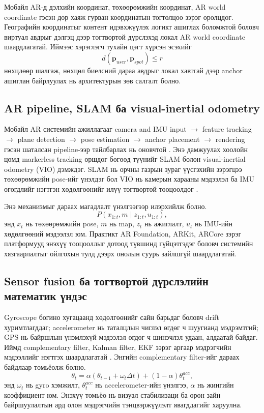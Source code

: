 \begin{sloppy}
Мобайл AR-д дэлхийн координат, төхөөрөмжийн координат, AR world coordinate гэсэн дор хаяж гурван координатын тогтолцоо зэрэг оролцдог. Географийн координатыг контент идэвхжүүлэх логикт ашиглах боломжтой боловч виртуал авдрыг дэлгэц дээр тогтвортой дүрслэхэд локал AR world coordinate шаардлагатай. Иймээс хэрэглэгч тухайн цэгт хүрсэн эсэхийг
\[
d(\mathbf{p}_{user}, \mathbf{p}_{spot}) \le r
\]
нөхцлөөр шалгаж, нөхцөл биелсний дараа авдрыг локал хавтгай дээр anchor ашиглан байрлуулах нь архитектурын зөв салгалт болно.

\subsection{AR pipeline, SLAM ба visual-inertial odometry}

Мобайл AR системийн ажиллагааг camera and IMU input $\rightarrow$ feature tracking $\rightarrow$ plane detection $\rightarrow$ pose estimation $\rightarrow$ anchor placement $\rightarrow$ rendering гэсэн шаталсан pipeline-ээр тайлбарлах нь оновчтой \cite{Arena2022AROverview,Haneefa2024}. Энэ дамжуулах хоолойн цөмд markerless tracking оршдог бөгөөд түүнийг SLAM болон visual-inertial odometry (VIO) дэмждэг. SLAM нь орчны газрын зураг үүсгэхийн зэрэгцээ төхөөрөмжийн pose-ийг үнэлдэг бол VIO нь камерын харааны мэдээлэл ба IMU өгөгдлийг нэгтгэн хөдөлгөөнийг илүү тогтвортой тооцоолдог \cite{Syed2022ARTracking}.

Энэ механизмыг дараах магадлалт үнэлгээгээр илэрхийлж болно.
\[
P(x_{1:t}, m \mid z_{1:t}, u_{1:t}),
\]
энд $x_t$ нь төхөөрөмжийн pose, $m$ нь map, $z_t$ нь ажиглалт, $u_t$ нь IMU-ийн хөдөлгөөний мэдээлэл юм. Практикт AR Foundation, ARKit, ARCore зэрэг платформууд энэхүү тооцооллыг дотоод түвшинд гүйцэтгэдэг боловч системийн хязгаарлалтыг ойлгохын тулд дээрх онолын суурь зайлшгүй шаардлагатай.

\subsection{Sensor fusion ба тогтвортой дүрслэлийн математик үндэс}

Gyroscope богино хугацаанд хөдөлгөөнийг сайн барьдаг боловч drift хуримтлагддаг; accelerometer нь таталцлын чиглэл өгдөг ч шуугианд мэдрэмтгий; GPS нь байршлын үнэмлэхүй мэдээлэл өгдөг ч шинэчлэл удаан, алдаатай байдаг. Иймд complementary filter, Kalman filter, EKF зэрэг аргаар мэдрэгчийн мэдээллийг нэгтгэх шаардлагатай \cite{Syed2022ARTracking,Kaplan2006}. Энгийн complementary filter-ийг дараах байдлаар томьёолж болно.
\[
\theta_t = \alpha(\theta_{t-1} + \omega_t \Delta t) + (1-\alpha)\theta^{acc}_t,
\]
энд $\omega_t$ нь gyro хэмжилт, $\theta^{acc}_t$ нь accelerometer-ийн үнэлгээ, $\alpha$ нь жингийн коэффициент юм. Энэхүү томьёо нь визуал стабилизаци ба орон зайн байршуулалтын ард олон мэдрэгчийн тэнцвэржүүлэлт явагддагийг харуулна.


\end{sloppy}
